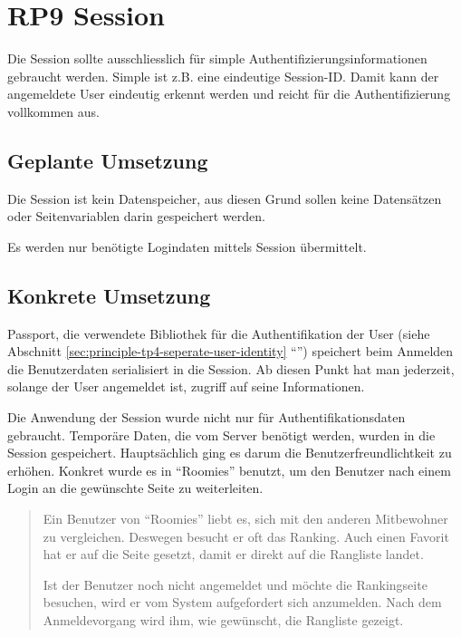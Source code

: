 \section{RP9 Session}
\label{sec:principle-rp9-session}

Die Session sollte ausschliesslich für simple Authentifizierungsinformationen gebraucht werden. Simple ist z.B. eine eindeutige Session-ID. Damit kann der angemeldete User eindeutig erkennt werden und reicht für die Authentifizierung vollkommen aus.

\subsection*{Geplante Umsetzung}
Die Session ist kein Datenspeicher, aus diesen Grund sollen keine Datensätzen oder Seitenvariablen darin gespeichert werden.

Es werden nur benötigte Logindaten mittels Session übermittelt.

\subsection*{Konkrete Umsetzung}
Passport, die verwendete Bibliothek für die Authentifikation der User (siehe Abschnitt \ref{sec:principle-tp4-seperate-user-identity} ``'') speichert beim Anmelden die Benutzerdaten serialisiert in die Session. Ab diesen Punkt hat man jederzeit, solange der User angemeldet ist, zugriff auf seine Informationen.

Die Anwendung der Session wurde nicht nur für Authentifikationsdaten gebraucht. Temporäre Daten, die vom Server benötigt werden, wurden in die Session gespeichert. Hauptsächlich ging es darum die Benutzerfreundlichtkeit zu erhöhen. Konkret wurde es in ``Roomies'' benutzt, um den Benutzer nach einem Login an die gewünschte Seite zu weiterleiten.

\begin{quotation}
Ein Benutzer von ``Roomies'' liebt es, sich mit den anderen Mitbewohner zu vergleichen. Deswegen besucht er oft das Ranking. Auch einen Favorit hat er auf die Seite gesetzt, damit er direkt auf die Rangliste landet.

Ist der Benutzer noch nicht angemeldet und möchte die Rankingseite besuchen, wird er vom System aufgefordert sich anzumelden. Nach dem Anmeldevorgang wird ihm, wie gewünscht, die Rangliste gezeigt.
\end{quotation}

